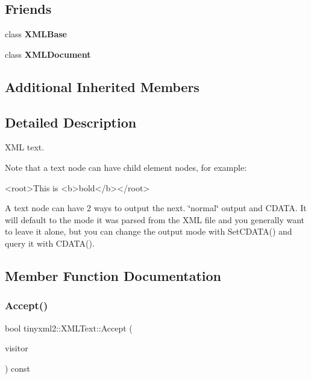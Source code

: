 \subsection*{Friends}
\begin{DoxyCompactItemize}
\item 
\mbox{\label{classtinyxml2_1_1XMLText_aaa44c4bd0693de6cd00d57cb21e81410}} 
class {\bfseries X\+M\+L\+Base}
\item 
\mbox{\label{classtinyxml2_1_1XMLText_a0a577a5e971b59b321cae12e5b61df55}} 
class {\bfseries X\+M\+L\+Document}
\end{DoxyCompactItemize}
\subsection*{Additional Inherited Members}


\subsection{Detailed Description}
X\+ML text.

Note that a text node can have child element nodes, for example\+: \begin{DoxyVerb}<root>This is <b>bold</b></root>
\end{DoxyVerb}


A text node can have 2 ways to output the next. \char`\"{}normal\char`\"{} output and C\+D\+A\+TA. It will default to the mode it was parsed from the X\+ML file and you generally want to leave it alone, but you can change the output mode with Set\+C\+D\+A\+T\+A() and query it with C\+D\+A\+T\+A(). 

\subsection{Member Function Documentation}
\mbox{\label{classtinyxml2_1_1XMLText_a537c60d7e18fb59c45ac2737a29ac47a}} 
\subsubsection{\texorpdfstring{Accept()}{Accept()}\hspace{0.1cm}{\footnotesize\ttfamily [1/2]}}
{\footnotesize\ttfamily bool tinyxml2\+::\+X\+M\+L\+Text\+::\+Accept (\begin{DoxyParamCaption}\item[{\hyperlink{classtinyxml2_1_1XMLVisitor}{X\+M\+L\+Visitor} $\ast$}]{visitor }\end{DoxyParamCaption}) const\hspace{0.3cm}{\ttfamily [virtual]}}

